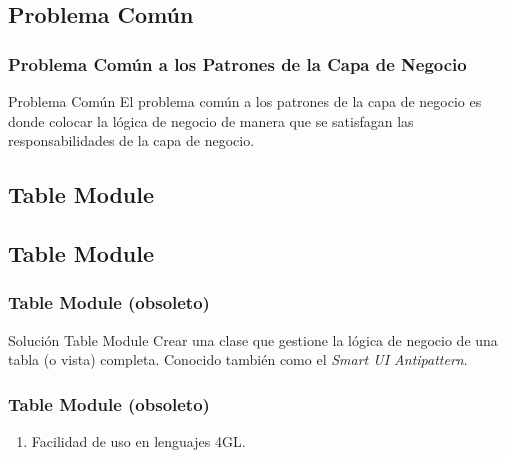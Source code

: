 \documentclass[a4paper,slidestop,xcolor=pst,dvips,blue]{beamer}
\begin{document}
\subsection{Problema Común}

\begin{frame}[c]
    \frametitle{Problema Común a los Patrones de la Capa de Negocio}
    \begin{block}{Problema Común}
        El problema común a los patrones de la capa de negocio es donde colocar la
        lógica de negocio de manera que se satisfagan las responsabilidades de la capa de negocio.
    \end{block}
\end{frame}

\subsection{Table Module}

\subsection{Table Module}

\begin{frame}[c]
    \frametitle{Table Module (obsoleto)}
    \begin{block}{Solución Table Module}
        Crear una clase que gestione la lógica de negocio de una tabla (o vista) completa. Conocido también como el \emph{Smart UI Antipattern}.
    \end{block}
\end{frame}

\begin{frame}[c]
    \frametitle{Table Module (obsoleto)}
    \begin{enumerate}
        \item<2-> Facilidad de uso en lenguajes 4GL.
    \end{enumerate}
    \ \\ \ \\
\end{frame}
\end{document}
